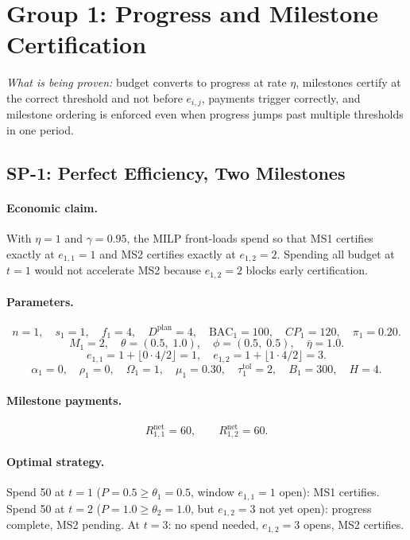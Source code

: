 \documentclass[11pt, a4paper]{article}
\newcommand{\BAC}{\mathrm{BAC}}
\begin{document}
\section{Group 1: Progress and Milestone Certification}

\textit{What is being proven:} budget converts to progress at rate $\eta$,
milestones certify at the correct threshold and not before $e_{i,j}$,
payments trigger correctly, and milestone ordering is enforced even when
progress jumps past multiple thresholds in one period.

\subsection{SP-1: Perfect Efficiency, Two Milestones}

\paragraph{Economic claim.}
With $\eta=1$ and $\gamma=0.95$, the MILP front-loads spend so that
MS1 certifies exactly at $e_{1,1}=1$ and MS2 certifies exactly at
$e_{1,2}=2$. Spending all budget at $t=1$ would not accelerate MS2
because $e_{1,2}=2$ blocks early certification.

\paragraph{Parameters.}
\[
  n=1,\quad s_1=1,\quad f_1=4,\quad D^{\mathrm{plan}}=4,\quad
  \BAC_1=100,\quad CP_1=120,\quad \pi_1=0.20.
\]
\[
  M_1=2,\quad \theta=(0.5,\;1.0),\quad \phi=(0.5,\;0.5),\quad \bar\eta=1.0.
\]
\[
  e_{1,1}=1+\lfloor0\cdot4/2\rfloor=1,\quad
  e_{1,2}=1+\lfloor1\cdot4/2\rfloor=3.
\]
\[
  \alpha_1=0,\quad\rho_1=0,\quad\Omega_1=1,\quad\mu_1=0.30,\quad
  \tau_1^{\mathrm{tol}}=2,\quad B_1=300,\quad H=4.
\]

\paragraph{Milestone payments.}
\[
  R_{1,1}^{\mathrm{net}}=60,\qquad R_{1,2}^{\mathrm{net}}=60.
\]

\paragraph{Optimal strategy.}
Spend 50 at $t=1$ ($P=0.5\geq\theta_1=0.5$, window $e_{1,1}=1$ open):
MS1 certifies. Spend 50 at $t=2$ ($P=1.0\geq\theta_2=1.0$, but
$e_{1,2}=3$ not yet open): progress complete, MS2 pending.
At $t=3$: no spend needed, $e_{1,2}=3$ opens, MS2 certifies.
\end{document}
